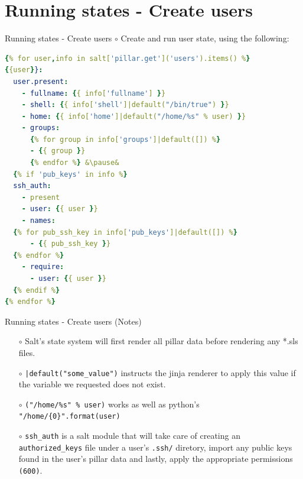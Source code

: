 \documentclass[dvipsnames]{beamer}
\begin{document}
\section{Running states - Create users}
\begin{frame}[fragile]{Running states - Create users}
\small
$\circ$ Create and run user state, using the following:
\begin{lstlisting}[language=yaml]
{% for user,info in salt['pillar.get']('users').items() %}
{{user}}:
  user.present:
    - fullname: {{ info['fullname'] }}
    - shell: {{ info['shell']|default("/bin/true") }}
    - home: {{ info['home']|default("/home/%s" % user) }}
    - groups:
      {% for group in info['groups']|default([]) %}
      - {{ group }}
      {% endfor %} &\pause&
  {% if 'pub_keys' in info %}
  ssh_auth:
    - present
    - user: {{ user }}
    - names:
  {% for pub_ssh_key in info['pub_keys']|default([]) %}
      - {{ pub_ssh_key }}
  {% endfor %}
    - require:
      - user: {{ user }}
  {% endif %}
{% endfor %}
\end{lstlisting}
\end{frame}
\normalsize
\begin{frame}[fragile]{Running states - Create users (Notes)}
\begin{itemize}
\item[$\circ$] Salt's state system will first render all pillar data before rendering any *.sls files.
\pause
\item[$\circ$] \texttt{|default("some\_value")} instructs the jinja renderer to apply this value 
if the variable we requested does not exist.
\pause
\item[$\circ$] \texttt{("/home/\%s" \% user)} works as well as 
python's \texttt{"/home/\{0\}".format(user)}
\pause
\item[$\circ$] \texttt{ssh\_auth} is a salt module that will take care of creating an 
\texttt{authorized\_keys} file under a user's \texttt{.ssh/} diretory, 
import any public keys found in the user's pillar data and lastly, apply the 
appropriate permissions \texttt{(600)}.
\end{itemize}
\end{frame}
\end{document}
